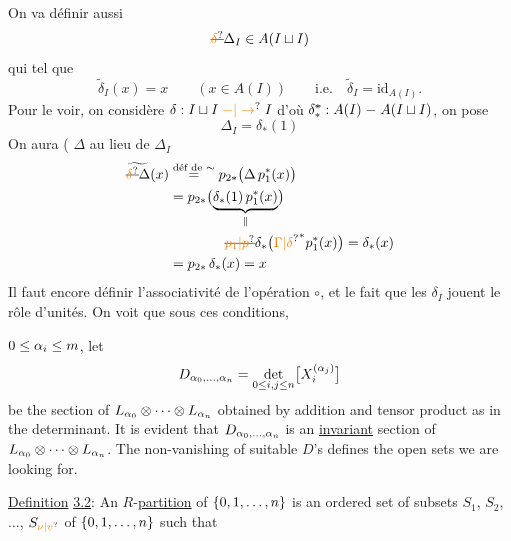 On va définir aussi
\[
 \deleted{\unsure{\delta}}\Delta_I\in A(I\sqcup I)
\]
qui  tel que
\[
 \widetilde{\delta}_I(x)=x\qquad (x\in A(I))\qquad \text{i.e.}\quad \widetilde{\delta}_I=\mathrm{id}_{A(I)}.
\]
Pour \deleted{\unsure{$\delta$}} le voir, on  considère $\delta:I\sqcup I\mathrel{\unsure{-|\to}}I$
d'où $\delta^{\deleted{*}}_*:A(I)\mathrel{-}A(I\sqcup I)$, on pose
\[
 \Delta_I=\delta_*(1)
\]
On aura ( $\Delta$ au lieu de $\Delta_I$
\[
\begin{aligned}
 \widetilde{\deleted{\unsure{\delta}}\Delta}(x)&\overset{\text{déf de }\sim}{=}p_{2*}\bigl(\Delta\,p_1^*(x)\bigr)\\
 &=p_{2*}\bigl(\underbrace{\delta_*(1)\,p_1^*(x)}_{\parallel}\bigr)\\
 &\hspace{4em}\deleted{\unsure{p_1|p}}\delta_*\bigl(\unsure{\Gamma|\delta}^*p_1^*(x)\bigr)=\delta_*(x)\\
 &=p_{2*}\,\delta_*(x)=x
\end{aligned}
\]
Il faut encore définir l'associativité de
l'opération $\circ$, et le fait que les $\delta_I$ jouent le
rôle d'unités. On voit que sous ces conditions,

$0\leq\alpha_i\leq m$, let
\[
 D_{\alpha_0,\ldots,\alpha_n}=\underset{0\leq i,j\leq n}{\det}
 \bigl[X_i^{(\alpha_j)}\bigr]
\]
be the section of $L_{\alpha_0}\otimes\cdots\otimes L_{\alpha_n}$ obtained by addition and tensor
product as in the determinant. It is evident that $D_{\alpha_0,\ldots,\alpha_n}$ is an
\uline{invariant} section of $L_{\alpha_0}\otimes\cdots\otimes L_{\alpha_n}$. The non-vanishing of suitable
$D$'s defines the open sets we are looking for.

\uline{Definition} \uline{3.2}: An \uline{$R$}-\uline{partition} of $\{0,1,\ldots,n\}$ is an ordered set
of subsets $S_1$, $S_2$, $\ldots$, $S_{\unsure{\nu|v}}$ of $\{0,1,\ldots,n\}$ such that

